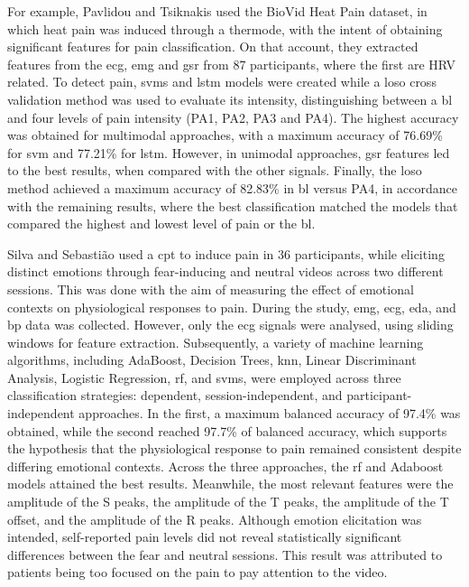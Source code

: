 For example, Pavlidou and Tsiknakis \cite{Pavlidou2025} used the BioVid Heat Pain dataset, in which heat pain was induced through a thermode, with the intent of obtaining significant features for pain classification. On that account, they extracted features from the \ac{ecg}, \ac{emg} and \ac{gsr} from 87 participants, where the first are HRV related. To detect pain, \acp{svm} and \ac{lstm} models were created while a \ac{loso} cross validation method was used to evaluate its intensity, distinguishing between a \ac{bl} and four levels of pain intensity (PA1, PA2, PA3 and PA4). The highest accuracy was obtained for multimodal approaches, with a maximum accuracy of 76.69\% for \ac{svm} and 77.21\% for \ac{lstm}. However, in unimodal approaches, \ac{gsr} features led to the best results, when compared with the other signals. Finally, the \ac{loso} method achieved a maximum accuracy of 82.83\% in \ac{bl} versus PA4, in accordance with the remaining results, where the best classification matched the models that compared the highest and lowest level of pain or the \ac{bl}.

Silva and Sebastião \cite{Silva2023} used a \ac{cpt} to induce pain in 36 participants, while eliciting distinct emotions through fear-inducing and neutral videos across two different sessions. This was done with the aim of measuring the effect of emotional contexts on physiological responses to pain. During the study, \ac{emg}, \ac{ecg}, \ac{eda}, and \ac{bp} data was collected. However, only the \ac{ecg} signals were analysed, using sliding windows for feature extraction. Subsequently, a variety of machine learning algorithms, including AdaBoost, Decision Trees, \ac{knn}, Linear Discriminant Analysis, Logistic Regression, \ac{rf}, and \acp{svm}, were employed across three classification strategies: dependent, session-independent, and participant-independent approaches. In the first, a maximum balanced accuracy of 97.4\% was obtained, while the second reached 97.7\% of balanced accuracy, which supports the hypothesis that the physiological response to pain remained consistent despite differing emotional contexts. Across the three approaches, the \ac{rf} and Adaboost models attained the best results. Meanwhile, the most relevant features were the amplitude of the S peaks, the amplitude of the T peaks, the amplitude of the T offset, and the amplitude of the R peaks. Although emotion elicitation was intended, self-reported pain levels did not reveal statistically significant differences between the fear and neutral sessions. This result was attributed to patients being too focused on the pain to pay attention to the video.

